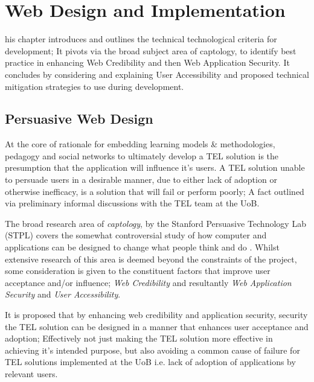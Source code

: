 %
%
\let\textcircled=\pgftextcircled
\chapter{Web Design and Implementation}
\label{Web Design and Implementation}


his chapter introduces and outlines the technical technological criteria for development; It pivots via the broad subject area of captology, to identify best practice in enhancing Web Credibility and then Web Application Security. It concludes by considering and explaining User Accessibility and proposed technical mitigation strategies to use during development.



\section{Persuasive Web Design}

At the core of rationale for embedding  learning models \& methodologies, pedagogy and social networks to ultimately develop a TEL solution is the presumption that the application will influence it's users. A TEL solution unable to persuade users in a desirable manner, due to either lack of adoption or otherwise inefficacy, is a solution that will fail or perform poorly; A fact outlined via preliminary informal discussions with the TEL team at the UoB.

The broad research area of \textit{captology}, by the Stanford Persuasive Technology Lab (STPL) covers the somewhat controversial study of  how computer and applications can be designed to change what people think and do \cite{Fogg2002a,Fogg2002,Fogg2001,Fogg1999}. Whilst extensive research of this area is deemed beyond the constraints of the project, some consideration is given to the constituent factors that improve user acceptance and/or influence; \textit{Web Credibility} and resultantly \textit{Web Application Security} and \textit{User Accessibility}.

It is proposed that by enhancing web credibility and application security, security the TEL solution can be designed in a manner that enhances user acceptance and adoption; Effectively not just making the TEL solution more effective in achieving it's intended purpose, but also avoiding a common cause of failure for TEL solutions implemented at the UoB i.e. lack of adoption of applications by relevant users.







